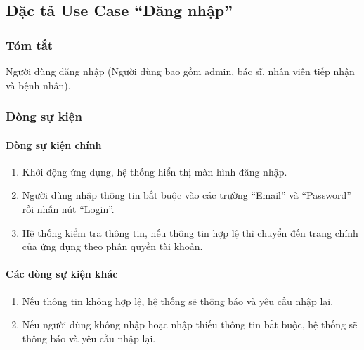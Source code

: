 \subsection{Đặc tả Use Case ``Đăng nhập''}

\subsubsection{Tóm tắt}
Người dùng đăng nhập (Người dùng bao gồm admin, bác sĩ, nhân viên tiếp nhận và bệnh nhân).

\subsubsection{Dòng sự kiện}
\paragraph{\textbf{Dòng sự kiện chính}}
\begin{enumerate}
  \item Khởi động ứng dụng, hệ thống hiển thị màn hình đăng nhập.
  \item Người dùng nhập thông tin bắt buộc vào các trường ``Email'' và ``Password'' rồi nhấn nút ``Login''.
  \item Hệ thống kiểm tra thông tin, nếu thông tin hợp lệ thì chuyển đến trang chính của ứng dụng theo phân quyền tài khoản.
\end{enumerate}

\paragraph{\textbf{Các dòng sự kiện khác}}
\begin{enumerate}
  \item Nếu thông tin không hợp lệ, hệ thống sẽ thông báo và yêu cầu nhập lại.
  \item Nếu người dùng không nhập hoặc nhập thiếu thông tin bắt buộc, hệ thống sẽ thông báo và yêu cầu nhập lại.
\end{enumerate}

